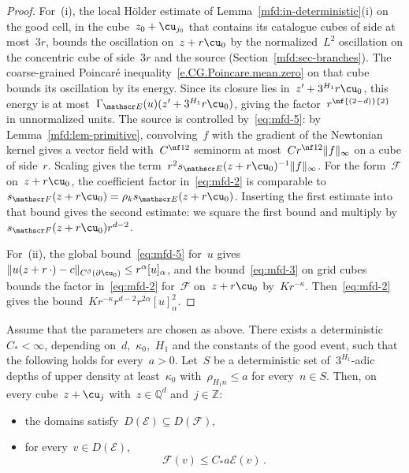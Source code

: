 \documentclass[11pt]{amsart}
\begin{document}
\begin{proof}
For~(i), the local H\"older estimate of Lemma~\ref{mfd:in-deterministic}(i) on the good cell, in the cube~$z_0+\cu_{j_0}$ that contains its catalogue cubes of side at most~$3r$, bounds the oscillation on~$z+r\cu_0$ by the normalized~$L^2$ oscillation on the concentric cube of side~$3r$ and the source (Section~\ref{mfd:sec-branches}). The coarse-grained Poincar\'e inequality~\eqref{e.CG.Poincare.mean.zero} on that cube bounds its oscillation by its energy. Since its closure lies in~$z'+3^{H_1}r\cu_0$, this energy is at most~$\Gamma_{\mathscr E}(u)(z'+3^{H_1}r\cu_0)$, giving the factor~$r^{\nf{(2-d)}{2}}$ in unnormalized units. The source is controlled by~\eqref{eq:mfd-5}: by Lemma~\ref{mfd:lem-primitive}, convolving~$f$ with the gradient of the Newtonian kernel gives a vector field with~$C^{\nf12}$ seminorm at most~$Cr^{\nf12}\|f\|_\infty$ on a cube of side~$r$. Scaling gives the term~$r^2s_{\mathscr E}(z+r\cu_0)^{-1}\|f\|_\infty$. For the form~$\mathscr F$ on~$z+r\cu_0$, the coefficient factor in~\eqref{eq:mfd-2} is comparable to~$s_{\mathscr F}(z+r\cu_0)=\rho_ks_{\mathscr E}(z+r\cu_0)$. Inserting the first estimate into that bound gives the second estimate: we square the first bound and multiply by~$s_{\mathscr F}(z+r\cu_0)r^{d-2}$.

\smallskip

For~(ii), the global bound~\eqref{eq:mfd-5} for~$u$ gives~$\|u(z+r\,\cdot)-c\|_{C^\beta(\partial \cu_0)}\leq r^\alpha[u]_\alpha$, and the bound~\eqref{eq:mfd-3} on grid cubes bounds the factor in~\eqref{eq:mfd-2} for~$\mathscr F$ on~$z+r\cu_0$ by~$Kr^{-\kappa}$. Then~\eqref{eq:mfd-2} gives the bound~$Kr^{-\kappa}r^{d-2}r^{2\alpha}[u]_\alpha^2$.
\end{proof}

\begin{proposition}
\label{mfd:prop-density}
Assume that the parameters are chosen as above. There exists a deterministic~$C_*<\infty$, depending on~$d$,~$\kappa_0$,~$H_1$ and the constants of the good event, such that the following holds for every~$a>0$. Let~$S$ be a deterministic set of~$3^{H_1}$-adic depths of upper density at least~$\kappa_0$ with~$\rho_{H_1n}\leq a$ for every~$n\in S$. Then, on every cube~$z+\cu_j$ with~$z\in\mathbb Q^d$ and~$j\in\mathbb Z$:
\begin{itemize}
\item the domains satisfy~$D(\mathscr E)\subseteq D(\mathscr F)$,
\item for every~$v\in D(\mathscr E)$,
\begin{equation}
	\mathscr F(v)\leq C_*a\mathscr E(v)\,.
	\label{eq:mfd-25}
\end{equation}
\end{itemize}
\end{proposition}
\end{document}
